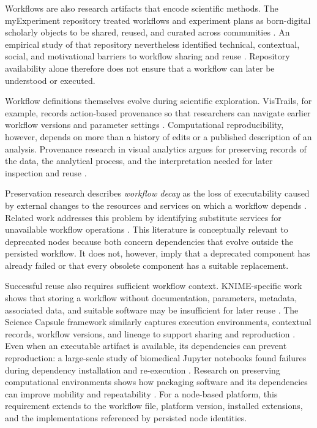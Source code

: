 \documentclass[runningheads]{llncs}
\begin{document}
Workflows are also research artifacts that encode scientific methods. The
myExperiment repository treated workflows and experiment plans as born-digital
scholarly objects to be shared, reused, and curated across communities
\cite{Goble2010MyExperiment}. An empirical study of that repository nevertheless
identified technical, contextual, social, and motivational barriers to
workflow sharing and reuse \cite{Procter2009Sharing}. Repository availability
alone therefore does not ensure that a workflow can later be understood or
executed.

Workflow definitions themselves evolve during scientific exploration.
VisTrails, for example, records action-based provenance so that researchers can
navigate earlier workflow versions and parameter settings
\cite{Freire2006Managing}. Computational reproducibility, however, depends on
more than a history of edits or a published description of an analysis.
Provenance research in visual analytics argues for preserving records of the
data, the analytical process, and the interpretation needed for later
inspection and reuse \cite{Walker2013ProveML}.

Preservation research describes \emph{workflow decay} as the loss of
executability caused by external changes to the resources and services on
which a workflow depends \cite{DeRoure2011Preservation}. Related work addresses
this problem by identifying substitute services for unavailable workflow
operations \cite{Belhajjame2011Substitute}. This literature is conceptually
relevant to deprecated nodes because both concern dependencies that evolve
outside the persisted workflow. It does not, however, imply that a deprecated
component has already failed or that every obsolete component has a suitable
replacement.

Successful reuse also requires sufficient workflow context. KNIME-specific
work shows that storing a workflow without documentation, parameters, metadata,
associated data, and suitable software may be insufficient for later reuse
\cite{Willoughby2017Documentation}. The Science Capsule framework similarly
captures execution environments, contextual records, workflow versions, and
lineage to support sharing and reproduction \cite{Ghoshal2021ScienceCapsule}.
Even when an executable artifact is available, its dependencies can prevent
reproduction: a large-scale study of biomedical Jupyter notebooks found
failures during dependency installation and re-execution
\cite{SamuelMietchen2024JupyterReproducibility}. Research on preserving
computational environments shows how packaging software and its dependencies
can improve mobility and repeatability \cite{Kurtzer2017Singularity}. For a
node-based platform, this requirement extends to the workflow file, platform
version, installed extensions, and the implementations referenced by persisted
node identities.
\end{document}
